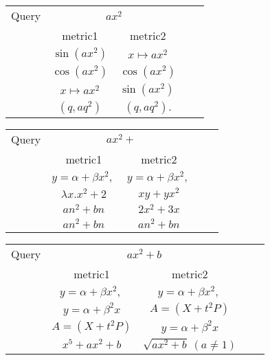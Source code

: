 \documentclass[12pt]{article} %
\begin{document}
\begin{center}
\begin{tabular}{lcccc}
Query  & \multicolumn{2}{c}{ $ax^2$ } \\ & metric1 & metric2 \\
\hline
 &  $  \displaystyle\sin(ax^{2})   $ & $  \textstyle x\mapsto ax^{2}            $ \\
 &  $  \displaystyle\cos(ax^{2})   $ & $ \displaystyle\cos(ax^{2})      $ \\
 &  $  \textstyle x\mapsto ax^{2}   $ & $  \displaystyle\sin(ax^{2})\,        $ \\
 &  $  (q,aq^{2})   $ & $    (q,aq^{2}).      $ \\
\end{tabular}
\end{center}

\begin{center}
\begin{tabular}{lcccc}
Query  & \multicolumn{2}{c}{ $ax^2 + $ } \\ & metric1 & metric2 \\
\hline
 &  $  y=\alpha+\beta x^{2},\,   $ & $    y=\alpha+\beta x^{2},\,   $ \\
 &  $  \lambda x.x^{2}+2   $ & $  xy+yx^{2}                    $ \\
 &  $  an^{2}+bn   $ & $   2x^{2}+3x               $ \\
 &  $  an^{2}+bn   $ & $   an^{2}+bn $ \\
\end{tabular}
\end{center}

\begin{center}
\begin{tabular}{lcccc}
Query  & \multicolumn{2}{c}{ $ax^2 + b$ } \\ & metric1 & metric2 \\
\hline
 &  $  y=\alpha+\beta x^{2},\,  $ & $  y=\alpha+\beta x^{2},\,            $ \\
 &  $  y=\alpha+\beta^{2}x  $ & $   A=(X+t^{2}P)                           $ \\
 &  $  A=(X+t^{2}P)   $ & $   y=\alpha+\beta^{2}x $ \\
 &  $  x^{5}+ax^{2}+b  $ & $  \sqrt{ax^{2}+b}\ (a\neq 1)        $ \\
\end{tabular}
\end{center}

\pagebreak
\end{document}
